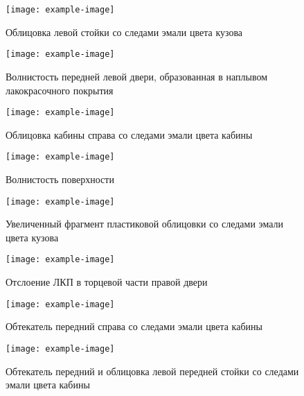 {    
           
    \begin{figure}[H]\centering
   	\parbox[t]{0.49\textwidth}
   	{\centering
   		\texttt{[image: example-image]}
   		\caption{\footnotesize {Облицовка левой стойки со следами эмали цвета кузова}}
   		\label{облицовкастойки}}
   	\hfil \hfil
   	\parbox[t]{0.49\textwidth}
   	{\centering
   		\texttt{[image: example-image]}
   		\caption{\footnotesize {Волнистость передней левой двери, образованная в наплывом лакокрасочного покрытия}}
   		\label{наплывслева}}
   \end{figure}

    \begin{figure}[H]\centering
   	\parbox[t]{0.49\textwidth}
   	{\centering
   		\texttt{[image: example-image]}
   		\caption{\footnotesize {Облицовка кабины справа со следами эмали цвета кабины}}
   		\label{облицовкаправо}}
   	\hfil \hfil
   	\parbox[t]{0.49\textwidth}
   	{\centering
   		\texttt{[image: example-image]}
   		\caption{\footnotesize {Волнистость поверхности}}
   		\label{волнистостьсправа}}
   \end{figure}

 \begin{figure}[H]\centering
	\parbox[t]{0.49\textwidth}
	{\centering
		\texttt{[image: example-image]}
		\caption{\footnotesize {Увеличенный фрагмент пластиковой облицовки со следами эмали цвета кузова}}
		\label{облицовкаэмаль}}
	\hfil \hfil
	\parbox[t]{0.49\textwidth}
	{\centering
		\texttt{[image: example-image]}
		\caption{\footnotesize {Отслоение ЛКП в торцевой части правой двери}}
		\label{отслоениелкп}}
\end{figure}
   
    \begin{figure}[H]\centering
   	\parbox[t]{0.49\textwidth}
   	{\centering
   		\texttt{[image: example-image]}
   		\caption{\footnotesize {Обтекатель передний справа со следами эмали цвета кабины}}
   		\label{обтекательп}}
   	\hfil \hfil
   	\parbox[t]{0.49\textwidth}
   	{\centering
   		\texttt{[image: example-image]}
   		\caption{\footnotesize {Обтекатель передний и облицовка левой передней стойки со следами эмали цвета кабины}}
   		\label{обтекательл}}
   \end{figure}
   
}
